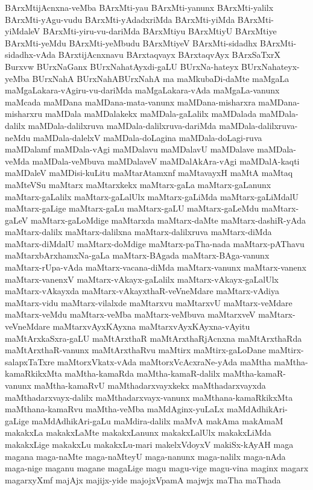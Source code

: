 {BArxMtijAcnxna-veMba
BArxMti-yau
BArxMti-yanunx
BArxMti-yalilx
BArxMti-yAgu-vudu
BArxMti-yAdadxriMda
BArxMti-yiMda
BArxMti-yiMdaleV
BArxMti-yiru-vu-dariMda
BArxMtiyu
BArxMtiyU
BArxMtiye
BArxMti-yeMdu
BArxMti-yeMbudu
BArxMtiyeV
BArxMti-sidadhx
BArxMti-sidadhx-vAda
BArxtijAcnxnavu
BArxtaqvayx
BArxtaqvAyx
BArxSaTxrX
Burxvw
BUrxNaGanx
BUrxNahatAyxdi-gaLU
BUrxNa-hateyx
BUrxNahateyx-yeMba
BUrxNahA
BUrxNahABUrxNahA
ma
maMkubaDi-daMte
maMgaLa
maMgaLakara-vAgiru-vu-dariMda
maMgaLakara-vAda
maMgaLa-vanunx
maMcada
maMDana
maMDana-mata-vanunx
maMDana-misharxra
maMDana-misharxru
maMDala
maMDalakekx
maMDala-gaLalilx
maMDalada
maMDala-dalilx
maMDala-dalilxruva
maMDala-dalilxruva-dariMda
maMDala-dalilxruva-neMdu
maMDala-dalelxV
maMDala-doLagina
maMDala-doLagi-ruva
maMDalamf
maMDala-vAgi
maMDalavu
maMDalavU
maMDalave
maMDala-veMda
maMDala-veMbuva
maMDalaveV
maMDalAkAra-vAgi
maMDalA-kaqti
maMDaleV
maMDisi-kuLitu
maMtarAtamxnf
maMtavayxH
maMtA
maMtaq
maMteVSu
maMtarx
maMtarxkekx
maMtarx-gaLa
maMtarx-gaLanunx
maMtarx-gaLalilx
maMtarx-gaLalUlx
maMtarx-gaLiMda
maMtarx-gaLiMdalU
maMtarx-gaLige
maMtarx-gaLu
maMtarx-gaLU
maMtarx-gaLeMdu
maMtarx-gaLeV
maMtarx-gaLoMdige
maMtarxda
maMtarx-daMte
maMtarx-dashiR-yAda
maMtarx-dalilx
maMtarx-dalilxna
maMtarx-dalilxruva
maMtarx-diMda
maMtarx-diMdalU
maMtarx-doMdige
maMtarx-paTha-nada
maMtarx-pAThavu
maMtarxbArxhamxNa-gaLa
maMtarx-BAgada
maMtarx-BAga-vanunx
maMtarx-rUpa-vAda
maMtarx-vacana-diMda
maMtarx-vanunx
maMtarx-vanenx
maMtarx-vanenxV
maMtarx-vAkayx-gaLalilx
maMtarx-vAkayx-gaLalUlx
maMtarx-vAkayxda
maMtarx-vAkayxthaR-veVneMdare
maMtarx-vAdiya
maMtarx-vidu
maMtarx-vilalxde
maMtarxvu
maMtarxvU
maMtarx-veMdare
maMtarx-veMdu
maMtarx-veMba
maMtarx-veMbuva
maMtarxveV
maMtarx-veVneMdare
maMtarxvAyxKAyxna
maMtarxvAyxKAyxna-vAyitu
maMtArxkaSxra-gaLU
maMtArxthaR
maMtArxthaRjAcnxna
maMtArxthaRda
maMtArxthaR-vanunx
maMtArxthaRvu
maMtirx
maMtirx-gaLoDane
maMtirx-salapxTaTxre
maMtorxVkatx-vAda
maMtorxVcAcxraNe-yAda
maMtha
maMtha-kamaRkikxMta
maMtha-kamaRda
maMtha-kamaR-dalilx
maMtha-kamaR-vanunx
maMtha-kamaRvU
maMthadarxvayxkekx
maMthadarxvayxda
maMthadarxvayx-dalilx
maMthadarxvayx-vanunx
maMthana-kamaRkikxMta
maMthana-kamaRvu
maMtha-veMba
maMdAginx-yuLaLx
maMdAdhikAri-gaLige
maMdAdhikAri-gaLu
maMdira-dalilx
maMvA
makAma
makAmaM
makakxLa
makakxLaMte
makakxLanunx
makakxLalUlx
makakxLiMda
makakxLige
makakxLu
makakxLu-mari
makelxVdoyxV
makiSx-kAyAH
maga
magana
maga-naMte
maga-naMteyU
maga-nanunx
maga-nalilx
maga-nAda
maga-nige
maganu
magane
magaLige
magu
magu-vige
magu-vina
maginx
magarx
magarxyXmf
majAjx
majijx-yide
majojxVpamA
majwjx
maTha
maThada
}
